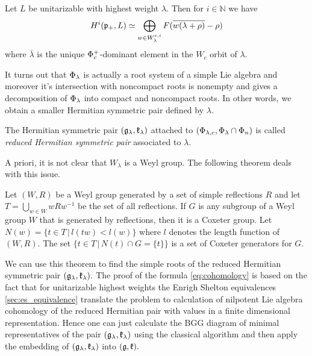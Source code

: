 \begin{theorem}\label{thm:cohomology}
 Let $L$ be unitarizable with highest weight $\lambda $. Then for $i\in \mathbb{N}$ we have
\begin{equation}\label{eq:cohomology}
 H^i(\mathfrak{p}_+,L)\simeq \bigoplus_{w\in W^{c,i}_\lambda} F(\overline{w(\lambda+\rho)} - \rho)
\end{equation}
where  $\overline{\lambda}$ is the unique $\Phi_c^+$-dominant element in the $W_c$ orbit of $\lambda$.
\end{theorem}

It turns out that $\Phi_\lambda$ is actually a root system of a simple Lie algebra and moreover it's intersection with noncompact roots is nonempty and gives a decomposition of $\Phi_\lambda$ into compact and noncompact roots. In other words, we obtain a smaller Hermitian symmetric pair defined by $\lambda$.

\begin{definition}
 The Hermitian symmetric pair $(\mathfrak{g}_\lambda, \mathfrak{k}_\lambda)$ attached to $(\Phi_{\lambda,c}, \Phi_\lambda \cap \Phi_n)$ is called \emph{reduced Hermitian symmetric pair} associated to $\lambda$.
\end{definition}

A priori, it is not clear that $W_\lambda$ is a Weyl group. The following theorem deals with this issue. 

\begin{theorem}
	Let $(W, R)$ be a Weyl group generated by a set of simple reflections $R$ and let $T = \bigcup_{w \in W} wRw^{-1}$ be the set of all reflections. 
	If $G$ is any subgroup of a Weyl group $W$ that is generated by reflections, then it is a Coxeter group. Let $N(w) = \{ t \in T \, | \, l(tw) < l(w) \}$ where $l$ denotes the length function of $(W, R).$ The set $\{ t \in T \,|\, N(t) \cap G = \{t\} \}$ is a set of Coxeter generators for $G$.
\end{theorem}

We can use this theorem to find the simple roots of the reduced Hermitian symmetric pair $(\mathfrak{g}_\lambda, \mathfrak{k}_\lambda).$ The proof of the formula \eqref{eq:cohomology} is based on the fact that for unitarizable highest weights the Enrigh Shelton equivalences \ref{sec:es_equivalence} translate the problem to calculation of nilpotent Lie algebra cohomology of the reduced Hermitian pair with values in a finite dimensional representation. Hence one can just calculate the BGG diagram of minimal representatives of the pair $(\mathfrak{g}_\lambda, \mathfrak{k}_\lambda)$ using the classical algorithm and then apply the embedding of $(\mathfrak{g}_\lambda, \mathfrak{k}_\lambda)$ into $(\mathfrak{g}, \mathfrak{k}).$

